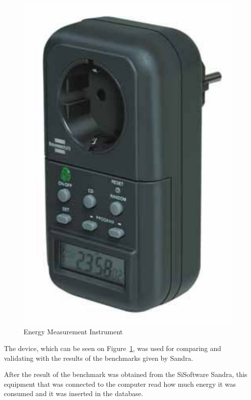         \begin{figure}[!htb]
            \centering
                \includegraphics[scale=0.6]{graphics/energy_measurement_instrument}
                \caption{Energy Measurement Instrument}
                \label{fig:energy_measurement_instrument}
        \end{figure}
    The device, which can be seen on Figure~\ref{fig:energy_measurement_instrument}, was used for comparing and validating with the results of the benchmarks given by Sandra.

    After the result of the benchmark was obtained from the SiSoftware Sandra, this equipment that was connected to the computer read how much energy it was consumed and it was inserted in the database.
    
